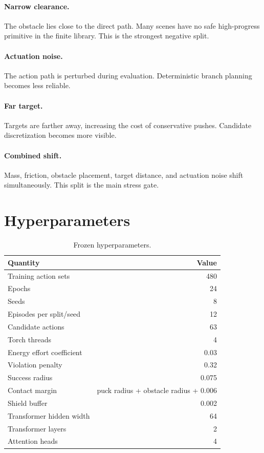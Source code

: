 \documentclass{article}
\begin{document}
\paragraph{Narrow clearance.}
The obstacle lies close to the direct path.  Many scenes have no safe high-progress primitive in the finite library.  This is the strongest negative split.

\paragraph{Actuation noise.}
The action path is perturbed during evaluation.  Deterministic branch planning becomes less reliable.

\paragraph{Far target.}
Targets are farther away, increasing the cost of conservative pushes.  Candidate discretization becomes more visible.

\paragraph{Combined shift.}
Mass, friction, obstacle placement, target distance, and actuation noise shift simultaneously.  This split is the main stress gate.

\section{Hyperparameters}

\begin{table}[h]
\centering
\caption{Frozen hyperparameters.}
\label{tab:hyperparams}
\small
\begin{tabular}{lr}
\toprule
Quantity & Value \\
\midrule
Training action sets & 480 \\
Epochs & 24 \\
Seeds & 8 \\
Episodes per split/seed & 12 \\
Candidate actions & 63 \\
Torch threads & 4 \\
Energy effort coefficient & 0.03 \\
Violation penalty & 0.32 \\
Success radius & 0.075 \\
Contact margin & puck radius + obstacle radius + 0.006 \\
Shield buffer & 0.002 \\
Transformer hidden width & 64 \\
Transformer layers & 2 \\
Attention heads & 4 \\
\bottomrule
\end{tabular}
\end{table}
\end{document}
